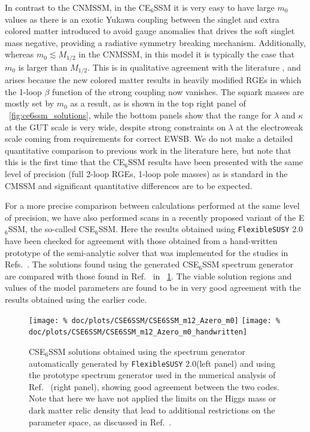\documentclass[final,3p,11pt,pdflatex]{elsarticle}
\makeatletter
\newcommand{\fs}{\texttt{FlexibleSUSY}\@\xspace}
\newcommand{\fstwo}{\fs 2.0\@\xspace}
\newcommand{\ESSM}{E$_6$SSM\@\xspace}
\newcommand{\figref}[1]{\figurename~\ref{#1}}
\newcommand{\mhalf}{\ensuremath{M_{1/2}}\xspace}
\newcommand{\mzero}{\ensuremath{m_0}\xspace}
\makeatother
\begin{document}
In contrast to the CNMSSM, in the C\ESSM it is very easy to have large
$\mzero$ values as there is an exotic Yukawa coupling between the singlet and
extra colored matter introduced to avoid gauge anomalies that drives the soft
singlet mass negative, providing a radiative symmetry breaking mechanism.
Additionally, whereas $\mzero \lesssim \mhalf$ in the CNMSSM, in this model
it is typically the case that $\mzero$ is larger than $\mhalf$.  This is
in qualitative agreement with the literature \cite{Athron:2009ue,
  Athron:2009bs,Athron:2012sq,Athron:2012pw}, and arises because the new
colored matter results in heavily modified RGEs in which the 1-loop
$\beta$ function of the strong coupling now vanishes.  The squark masses are
mostly set by $\mzero$ as a result, as is shown in the top right panel of
\figref{fig:ce6ssm_solutions}, while the bottom panels show that the range for
$\lambda$ and $\kappa$ at the GUT scale is very wide, despite strong
constraints on $\lambda$ at the electroweak scale coming from requirements for correct
EWSB\@.   We do not make a detailed quantitative comparison to previous work in
the literature here, but note that this is the first time that the C\ESSM
results have been presented with the same level of precision (full 2-loop RGEs,
1-loop pole masses) as is standard in the CMSSM and significant quantitative
differences are to be expected.

For a more precise comparison between calculations performed at the
same level of precision, we have also performed scans in a recently proposed
variant of the \ESSM, the so-called CS\ESSM \cite{Athron:2015vxg,
  Athron:2016gor}. Here the results obtained using \fstwo have been checked for
agreement with those obtained from a hand-written prototype of the
semi-analytic solver that was implemented for the studies in
Refs.~\cite{Athron:2015vxg,Athron:2016gor}.  The solutions found using the
generated CS\ESSM spectrum generator are compared with those found in
Ref.~\cite{Athron:2016gor} in \figref{fig:cse6ssm_m12_Azero_plane}.  The viable
solution regions and values of the model parameters are found to be in very
good agreement with the results obtained using the earlier code.
%
\begin{figure}[tbh]
  \centering
  \texttt{[image: \%
    doc/plots/CSE6SSM/CSE6SSM\_m12\_Azero\_m0]}
  \texttt{[image: \%
    doc/plots/CSE6SSM/CSE6SSM\_m12\_Azero\_m0\_handwritten]}
  \caption{CS\ESSM solutions obtained using the spectrum generator
    automatically generated by \fstwo (left panel) and using the prototype
    spectrum generator used in the numerical analysis of
    Ref.~\cite{Athron:2016gor} (right panel), showing good agreement between
    the two codes.  Note that here we have not applied the limits on the Higgs
    mass or dark matter relic density that lead to additional restrictions on
    the parameter space, as discussed in Ref.~\cite{Athron:2016gor}.}
  \label{fig:cse6ssm_m12_Azero_plane}
\end{figure}
\end{document}
